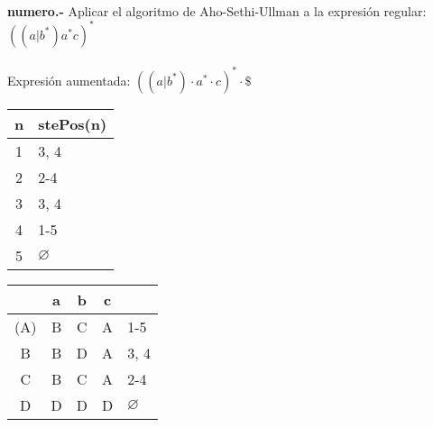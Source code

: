 \paragraph{}
\textbf{{numero}.-} Aplicar el algoritmo de Aho-Sethi-Ullman a la expresión regular: \textbf{$ ((a|b^*)a^*c)^* $} \\
\\
Expresión aumentada: $ ((a|b^*)\cdot a^*\cdot c)^*\cdot \$  $ \\

\begin{tabular} {| c | l |}
\hline
n & stePos(n) \\ \hline
1 & 3, 4 \\ \hline
2 & 2-4 \\ \hline
3 & 3, 4 \\ \hline
4 & 1-5 \\ \hline
5 & $\varnothing$ \\ \hline
\end{tabular}
\quad
\begin{tabular} {| c | c |c |c | l |}
\hline 
& a & b & c & \\ \hline
(A) & B & C & A & 1-5\\ \hline
B & B & D & A & 3, 4\\ \hline
C & B & C & A & 2-4\\ \hline
D & D & D & D & $\varnothing$\\ \hline
\end{tabular}
